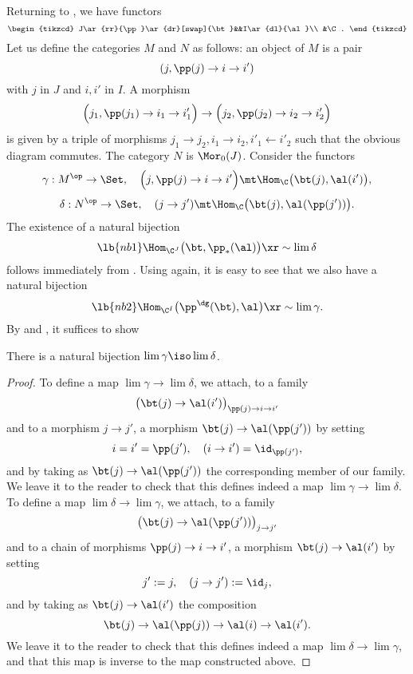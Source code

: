\documentclass[12pt]{article}
\theoremstyle{remark}
\theoremstyle{definition}
\begin{document}
Returning to , we have functors 
$$
\begin{tikzcd}
J\ar{rr}{\pp}\ar{dr}[swap]{\bt}&&I\ar{dl}{\al}\\ 
&\C.
\end{tikzcd}
$$ 
Let us define the categories $M$ and $N$ as follows: an object of $M$ is a pair 
$$
(j,\pp(j)\to i\to i')
$$ 
with $j$ in $J$ and $i,i'$ in $I$. A morphism 
$$
\Big(j_1,\pp(j_1)\to i_1\to i'_1\Big)\to\Big(j_2,\pp(j_2)\to i_2\to i'_2\Big)
$$ 
is given by a triple of morphisms $j_1\to j_2,i_1\to i_2,i'_1\leftarrow i'_2$ such that the obvious diagram commutes. The category $N$ is $\Mor_0(J)$. Consider the functors 
$$
\gamma:M^{\op}\to\Set,\quad\Big(j,\pp(j)\to i\to i'\Big)\mt\Hom_\C\big(\bt(j),\al(i')\big), 
$$ 
$$
\delta:N^{\op}\to\Set,\quad(j\to j')\mt\Hom_\C\big(\bt(j),\al(\pp(j'))\big). 
$$ 
The existence of a natural bijection 
\begin{equation}\lb{nb1}
\Hom_{\C^J}\big(\bt,\pp_*(\al)\big)\xr\sim\lim\delta
\end{equation} 
follows immediately from . Using  again, it is easy to see that we also have a natural bijection 
\begin{equation}\lb{nb2}
\Hom_{\C^I}\big(\pp^\dg(\bt),\al\big)\xr\sim\lim\gamma.
\end{equation} 
By  and , it suffices to show 
% 
\begin{lem}
There is a natural bijection $\lim\gamma\iso\lim\delta$. 
\end{lem} 
%
\begin{proof}
To define a map $\lim\gamma\to\lim\delta$, we attach, to a family 
$$
\big(\bt(j)\to\al(i')\big)_{\pp(j)\to i\to i'}
$$ 
and to a morphism $j\to j'$, a morphism $\bt(j)\to\al(\pp(j'))$ by setting 
$$
i=i'=\pp(j'),\quad(i\to i')=\id_{\pp(j')},
$$ 
and by taking as $\bt(j)\to\al(\pp(j'))$ the corresponding member of our family. We leave it to the reader to check that this defines indeed a map $\lim\gamma\to\lim\delta$. To define a map $\lim\delta\to\lim\gamma$, we attach, to a family 
$$
\big(\bt(j)\to\al(\pp(j'))\big)_{j\to j'}
$$ 
and to a chain of morphisms $\pp(j)\to i\to i'$, a morphism $\bt(j)\to\al(i')$ by setting 
$$
j':=j,\quad(j\to j'):=\id_{j},
$$ 
and by taking as $\bt(j)\to\al(i')$ the composition 
$$
\bt(j)\to\al(\pp(j))\to\al(i)\to\al(i'). 
$$ 
We leave it to the reader to check that this defines indeed a map $\lim\delta\to\lim\gamma$, and that this map is inverse to the map constructed above.
\end{proof}
%
\end{document}
